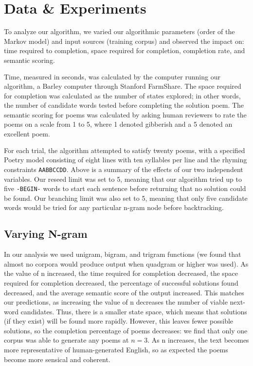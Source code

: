 \documentclass[10pt,twocolumn]{article}
\begin{document}
\section{Data \& Experiments}
To analyze our algorithm, we varied our algorithmic parameters (order of the Markov model) and input sources (training corpus) and observed the impact on: time required to completion, space required for completion, completion rate, and semantic scoring. 

Time, measured in seconds, was calculated by the computer running our algorithm, a Barley computer through Stanford FarmShare. The space required for completion was calculated as the number of states explored; in other words, the number of candidate words tested before completing the solution poem. The semantic scoring for poems was calculated by asking human reviewers to rate the poems on a scale from 1 to 5, where 1 denoted gibberish and a 5 denoted an excellent poem. 

For each trial, the algorithm attempted to satisfy twenty poems, with a specified Poetry model consisting of eight lines with ten syllables per line and the rhyming constraints \verb+AABBCCDD+. Above is a summary of the effects of our two independent variables. Our reseed limit was set to 5, meaning that our algorithm tried up to five \verb!-BEGIN-! words to start each sentence before returning that no solution could be found. Our branching limit was also set to 5, meaning that only five candidate words would be tried for any particular n-gram node before backtracking.

\subsection{Varying N-gram}
In our analysis we used unigram, bigram, and trigram functions (we found that almost no corpora would produce output when quadgram or higher was used). As the value of n increased, the time required for completion decreased, the space required for completion decreased, the percentage of successful solutions found decreased, and the average semantic score of the output increased. This matches our predictions, as increasing the value of n decreases the number of viable next-word candidates. Thus, there is a smaller state space, which means that solutions (if they exist) will be found more rapidly. However, this leaves fewer possible solutions, so the completion percentage of poems decreases: we find that only one corpus was able to generate any poems at $n=3$. As n increases, the text becomes more representative of human-generated English, so as expected the poems become more sensical and coherent.
\end{document}
